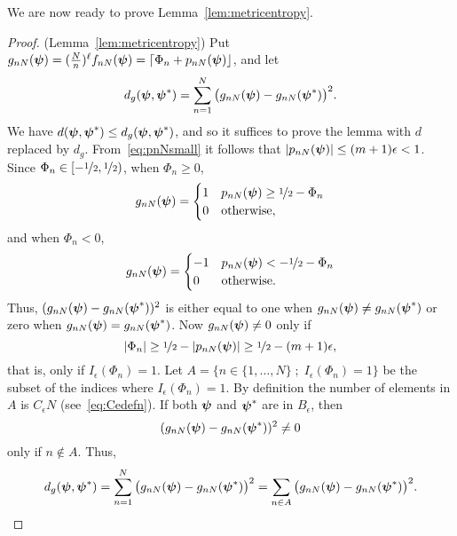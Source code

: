 \documentclass[aap]{imsart}
\renewcommand{\mid}{\; ; \;}
\newcommand{\abs}[1]{\left\vert #1 \right\vert}
\newcommand{\round}[1]{{\left\lceil #1 \right\rfloor}}
\begin{document}
We are now ready to prove Lemma~\ref{lem:metricentropy}.

\begin{proof} (Lemma~\ref{lem:metricentropy})
Put $g_{nN}(\psibf) = (\tfrac{N}{n})^\ell f_{nN}(\psibf) = \round{ \Phi_n + p_{nN}(\psibf)}$, and let
\[
d_g(\boldsymbol{\psi}, \boldsymbol{\psi}^*) = \sum_{n=1}^{N} \big( g_{nN}(\boldsymbol{\psi}) - g_{nN}(\boldsymbol{\psi}^*) \big)^2.
\]
We have $d(\boldsymbol{\psi}, \boldsymbol{\psi}^*) \leq d_g(\boldsymbol{\psi}, \boldsymbol{\psi}^*)$, and so it suffices to prove the lemma with $d$ replaced by $d_g$.  
From~\eqref{eq:pnNsmall} it follows that $\abs{p_{nN}(\psibf)} \leq (m+1)\epsilon < 1$.  Since $\Phi_n \in [-\nicefrac{1}{2}, \nicefrac{1}{2})$, when $\Phi_n \geq 0$,
\[
g_{nN}(\psibf) = \begin{cases}
1 & p_{nN}(\psibf) \geq \nicefrac{1}{2} - \Phi_n \\
0 & \text{otherwise},
\end{cases}
\]
and when $\Phi_n < 0$,
\[
g_{nN}(\psibf) = \begin{cases}
-1 & p_{nN}(\psibf) < -\nicefrac{1}{2} - \Phi_n \\
0 & \text{otherwise}.
\end{cases}
\]
Thus, $( g_{nN}(\boldsymbol{\psi}) - g_{nN}(\boldsymbol{\psi}^*) )^2$ is either equal to one when $g_{nN}(\boldsymbol{\psi}) \neq g_{nN}(\boldsymbol{\psi}^*)$ or zero when $g_{nN}(\boldsymbol{\psi}) = g_{nN}(\boldsymbol{\psi}^*)$.  Now $g_{nN}(\boldsymbol{\psi}) \neq 0$ only if 
\[
\abs{\Phi_n} \geq \nicefrac{1}{2} - \abs{p_{nN}(\psibf)} \geq \nicefrac{1}{2} - (m+1)\epsilon,
\]
that is, only if $I_\epsilon(\Phi_n) = 1$.  Let $A = \{ n \in \{1, \dots, N\} \mid I_\epsilon(\Phi_n) = 1 \}$ be the subset of the indices where $I_\epsilon(\Phi_n) = 1$.  By definition the number of elements in $A$ is $C_\epsilon N$ (see~\eqref{eq:Cedefn}).  If both $\boldsymbol{\psi}$ and $\boldsymbol{\psi}^*$ are in $B_\epsilon$, then 
\[
(g_{nN}(\boldsymbol{\psi}) - g_{nN}(\boldsymbol{\psi}^*) )^2 \neq 0 
\]
only if $n \notin A$.  Thus,
\begin{align*}
d_g(\psibf, \psibf^*) = \sum_{n=1}^{N} \big( g_{nN}(\psibf) - g_{nN}(\psibf^*) \big)^2 = \sum_{n \in A} \big( g_{nN}(\psibf) - g_{nN}(\psibf^*) \big)^2.
\end{align*}


\end{proof}
\end{document}
